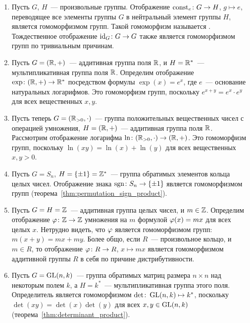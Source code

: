 \begin{examples}
\begin{enumerate}
\item Пусть $G$, $H$~--- произвольные группы. Отображение
  $\operatorname{const}_e\colon G\to H$, $g\mapsto e$, переводящее все элементы
  группы $G$ в нейтральный элемент группы $H$, является гомоморфизмом
  групп. Такой гомоморфизм называется
  .
  Тождественное отображение $\operatorname{id}_G\colon G\to G$ также является
  гомоморфизмом групп по тривиальным причинам.
\item Пусть $G = (\mathbb R,+)$~--- аддитивная группа поля $\mathbb R$, и $H =
  \mathbb R^*$~--- мультипликативная группа поля $\mathbb R$. Определим
  отображение $\exp\colon (\mathbb R,+)\to \mathbb R^*$ посредством формулы
  $\exp(x) = e^x$, где $e$~--- основание натуральных логарифмов. Это
  гомоморфизм групп, поскольку $e^{x+y} = e^x\cdot e^y$ для всех
  вещественных $x,y$.
\item Пусть теперь $G = (\mathbb R_{>0},\cdot)$~--- группа положительных
  вещественных чисел с операцией умножения, $H = (\mathbb R,+)$~---
  аддитивная группа поля $\mathbb R$. Рассмотрим отображение логарифма
  $\ln\colon (\mathbb R_{>0},\cdot)\to (\mathbb R,+)$. Это гомоморфизм групп,
  поскольку $\ln(xy) = \ln(x) + \ln(y)$ для всех вещественных
  $x,y>0$.
\item Пусть $G = S_n$, $H=\{\pm 1\} = \mathbb Z^*$~--- группа обратимых
  элементов кольца целых чисел. Отображение знака
  $\operatorname{sgn}\colon S_n\to\{\pm 1\}$ является гомоморфизмом групп
  (теорема~\ref{thm:permutation_sign_product}).
\item Пусть $G = H = \mathbb Z$~--- аддитивная группа целых чисел, и
  $m\in\mathbb Z$. Определим отображение $\varphi\colon\mathbb Z\to\mathbb Z$
  умножения на $m$ формулой $\varphi(x) = mx$ для всех целых $x$. Нетрудно
  видеть, что $\varphi$ является гомоморфизмом групп: $m(x+y) = mx +
  my$. Более общо, если $R$~--- произвольное кольцо, и $m\in R$, то
  отображение $\varphi\colon R\to R$, $x\mapsto mx$ является гомоморфизмом
  аддитивной группы $R$ в себя по причине дистрибутивности.
\item Пусть $G = \operatorname{GL}(n,k)$~--- группа обратимых матриц размера
  $n\times n$ над некоторым полем $k$, а $H=k^*$~--- мультипликативная
  группа этого поля. Определитель является гомоморфизмом
  $\det\colon\operatorname{GL}(n,k)\mapsto k^*$, поскольку $\det(xy) =
  \det(x)\det(y)$ для всех $x,y\in\operatorname{GL}(n,k)$
  (теорема~\ref{thm:determinant_product}).
\end{enumerate}
\end{examples}

